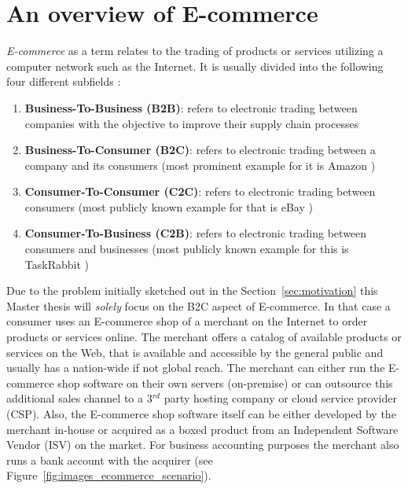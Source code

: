 
\section{An overview of \gls{E-commerce}}
\label{sec:e_commerce_scenario}

\emph{\gls{E-commerce}} as a term relates to the trading of products or services utilizing a computer network such as the Internet. It is usually divided into the following four different subfields \citep{sen2015study}:\@

\begin{enumerate}
  \item \textbf{Business-To-Business (\gls{B2B})}: refers to electronic trading between companies with the objective to improve their supply chain processes
  \item \textbf{Business-To-Consumer (\gls{B2C})}: refers to electronic trading between a company and its consumers (most prominent example for it is Amazon \citep{Amazon.com})
  \item \textbf{Consumer-To-Consumer (\gls{C2C})}: refers to electronic trading between consumers (most publicly known example for that is eBay \citep{eBayInc})
  \item \textbf{Consumer-To-Business (\gls{C2B})}: refers to electronic trading between consumers and businesses (most publicly known example for this is TaskRabbit \citep{TaskRabbit})
\end{enumerate}

Due to the problem initially sketched out in the Section~\ref{sec:motivation} this Master thesis will \emph{solely} focus on the \gls{B2C} aspect of \gls{E-commerce}. In that case a consumer uses an \gls{E-commerce} shop of a merchant on the Internet to order products or services online. The merchant offers a catalog of available products or services on the Web, that is available and accessible by the general public and usually has a nation-wide if not global reach. The merchant can either run the \gls{E-commerce} shop software on their own servers (on-premise) or can outsource this additional sales channel to a 3$^{rd}$ party hosting company or cloud service provider (\gls{CSP}). Also, the \gls{E-commerce} shop software itself can be either developed by the merchant in-house or acquired as a boxed product from an Independent Software Vendor (\gls{ISV}) on the market. For business accounting purposes the merchant also runs a bank account with the acquirer (see Figure~\ref{fig:images_ecommerce_scenario}). \\

